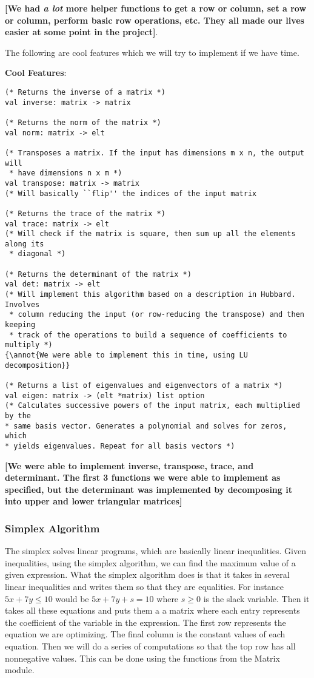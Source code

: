 \documentclass[letterpaper,11pt]{article}
\newcommand{\annot}[1]{\textbf{\color{BrickRed} [#1]}}
\begin{document}
{\annot{We had \emph{a lot} more helper functions to get a row or column, set a
row or column, perform basic row operations, etc. They all made our lives easier
at some point in the project}}.

The following are cool features which we will try to implement if we have time. 

\textbf{Cool Features}:

\begin{verbatim}
(* Returns the inverse of a matrix *)
val inverse: matrix -> matrix

(* Returns the norm of the matrix *)
val norm: matrix -> elt

(* Transposes a matrix. If the input has dimensions m x n, the output will
 * have dimensions n x m *)
val transpose: matrix -> matrix
(* Will basically ``flip'' the indices of the input matrix

(* Returns the trace of the matrix *)
val trace: matrix -> elt
(* Will check if the matrix is square, then sum up all the elements along its
 * diagonal *)

(* Returns the determinant of the matrix *)
val det: matrix -> elt
(* Will implement this algorithm based on a description in Hubbard. Involves
 * column reducing the input (or row-reducing the transpose) and then keeping
 * track of the operations to build a sequence of coefficients to multiply *)
{\annot{We were able to implement this in time, using LU decomposition}}

(* Returns a list of eigenvalues and eigenvectors of a matrix *)
val eigen: matrix -> (elt *matrix) list option
(* Calculates successive powers of the input matrix, each multiplied by the
* same basis vector. Generates a polynomial and solves for zeros, which
* yields eigenvalues. Repeat for all basis vectors *) 
\end{verbatim}

{\annot{We were able to implement inverse, transpose, trace, and determinant.
The first 3 functions we were able to implement as specified, but the
determinant was implemented by decomposing it into upper and lower triangular
matrices}}

\subsubsection{Simplex Algorithm}

The simplex solves linear programs, which are basically linear inequalities.
Given inequalities, using the simplex algorithm, we can find the maximum value
of a given expression. What the simplex algorithm does is that it takes in
several linear inequalities and writes them so that they are equalities. For
instance $5x + 7y \leq 10$ would be $5x + 7y + s = 10$ where $s \geq 0$ is the
slack variable. Then it takes all these equations and puts them a a matrix where
each entry represents the coefficient of the variable in the expression. The
first row represents the equation we are optimizing. The final column is the
constant values of each equation. Then we will do a series of computations so
that the top row has all nonnegative values. This can be done using the
functions from the Matrix module. 
\end{document}
